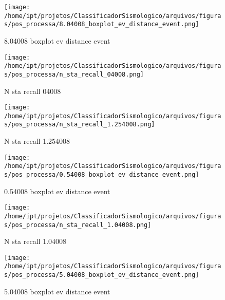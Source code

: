 
    \begin{figure}[H]
        \centering
        \texttt{[image: /home/ipt/projetos/ClassificadorSismologico/arquivos/figuras/pos\_processa/8.04008\_boxplot\_ev\_distance\_event.png]}
        \caption{8.04008 boxplot ev distance event}
        \label{fig:8.04008_boxplot_ev_distance_event}
    \end{figure}
                

    \begin{figure}[H]
        \centering
        \texttt{[image: /home/ipt/projetos/ClassificadorSismologico/arquivos/figuras/pos\_processa/n\_sta\_recall\_04008.png]}
        \caption{N sta recall 04008}
        \label{fig:n_sta_recall_04008}
    \end{figure}
                

    \begin{figure}[H]
        \centering
        \texttt{[image: /home/ipt/projetos/ClassificadorSismologico/arquivos/figuras/pos\_processa/n\_sta\_recall\_1.254008.png]}
        \caption{N sta recall 1.254008}
        \label{fig:n_sta_recall_1.254008}
    \end{figure}
                

    \begin{figure}[H]
        \centering
        \texttt{[image: /home/ipt/projetos/ClassificadorSismologico/arquivos/figuras/pos\_processa/0.54008\_boxplot\_ev\_distance\_event.png]}
        \caption{0.54008 boxplot ev distance event}
        \label{fig:0.54008_boxplot_ev_distance_event}
    \end{figure}
                

    \begin{figure}[H]
        \centering
        \texttt{[image: /home/ipt/projetos/ClassificadorSismologico/arquivos/figuras/pos\_processa/n\_sta\_recall\_1.04008.png]}
        \caption{N sta recall 1.04008}
        \label{fig:n_sta_recall_1.04008}
    \end{figure}
                

    \begin{figure}[H]
        \centering
        \texttt{[image: /home/ipt/projetos/ClassificadorSismologico/arquivos/figuras/pos\_processa/5.04008\_boxplot\_ev\_distance\_event.png]}
        \caption{5.04008 boxplot ev distance event}
        \label{fig:5.04008_boxplot_ev_distance_event}
    \end{figure}
                

